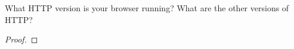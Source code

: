 \documentclass[../../main.tex]{subfiles}
\begin{document}
\begin{wts}
What HTTP version is your browser running? What are the other versions of HTTP?
\end{wts}
\begin{proof}

\end{proof}
\end{document}
